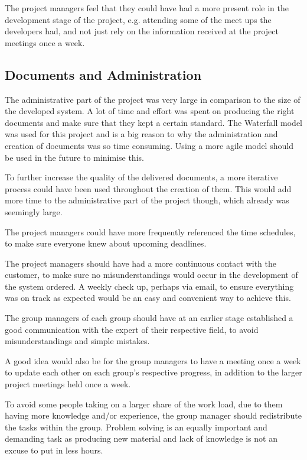 \documentclass[a4paper]{article}
\begin{document}
The project managers feel that they could have had a more present role in the development stage of the project, e.g. attending some of the meet ups the developers had, and not just rely on the information received at the project meetings once a week. 

\subsection{Documents and Administration}
The administrative part of the project was very large in comparison to the size of the developed system. A lot of time and effort was spent on producing the right documents and make sure that they kept a certain standard. The Waterfall model was used for this project and is a big reason to why the administration and creation of documents was so time consuming. Using a more agile model should be used in the future to minimise this.

To further increase the quality of the delivered documents, a more iterative process could have been used throughout the creation of them. This would add more time to the administrative part of the project though, which already was seemingly large.

The project managers could have more frequently referenced the time schedules, to make sure everyone knew about upcoming deadlines.

The project managers should have had a more continuous contact with the customer, to make sure no misunderstandings would occur in the development of the system ordered. A weekly check up, perhaps via email, to ensure everything was on track as expected would be an easy and convenient way to achieve this. 

The group managers of each group should have at an earlier stage established a good communication with the expert of their respective field, to avoid misunderstandings and simple mistakes. 

A good idea would also be for the group managers to have a meeting once a week to update each other on each group's respective progress, in addition to the larger project meetings held once a week.

To avoid some people taking on a larger share of the work load, due to them having more knowledge and/or experience, the group manager should redistribute the tasks within the group. Problem solving is an equally important and demanding task as producing new material and lack of knowledge is not an excuse to put in less hours.
\end{document}
